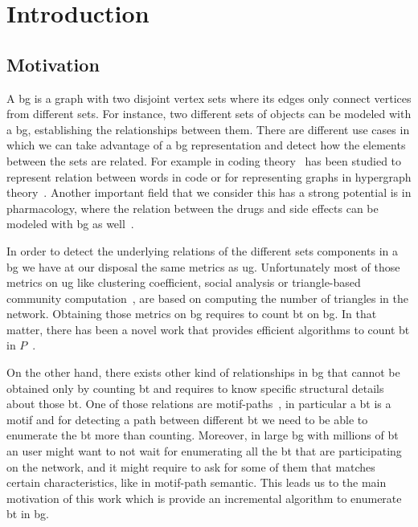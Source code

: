 \chapter{Introduction}\label{intro}
\section{Motivation}
A \acrfull{bg} is a graph with two disjoint vertex sets where its edges only connect vertices from different sets. 
For instance, two different sets of objects can be modeled with a \acrshort{bg}, establishing the relationships between them.
There are different use cases in which we can take advantage of a \acrshort{bg} representation and detect how the elements between the sets
are related. For example in coding theory~\cite{DBLP:journals/corr/WangL13} has been studied to represent relation between words in code 
or for representing graphs in hypergraph theory~\cite{hypergraph}. Another important field that we consider this has a strong potential is 
in pharmacology, where the relation between the drugs and side effects can be modeled with \acrshort{bg} as well~\cite{drugs}.

In order to detect the underlying relations of the different sets components in a \acrshort{bg} we have at our disposal the same metrics as \acrfull{ug}.
Unfortunately most of those metrics on \acrshort{ug} like clustering coefficient, social analysis or triangle-based community computation~\cite{ccoef,detect_graph,Newman_2003},
are based on computing the number of triangles in the network. Obtaining those metrics on \acrshort{bg} requires to count \acrfull{bt} on \acrshort{bg}.
In that matter, there has been a novel work that provides efficient algorithms to count \acrshort{bt} in $P$~\cite{btcount}.

On the other hand, there exists other kind of relationships in \acrshort{bg} that cannot be obtained only by counting \acrshort{bt} and requires to know specific
structural details about those \acrshort{bt}. One of those relations are motif-paths~\cite{Li2019MotifPA}, in particular a \acrshort{bt} is a motif and for detecting
a path between different \acrshort{bt} we need to be able to enumerate the \acrshort{bt} more than counting.
Moreover, in large \acrshort{bg} with millions of \acrshort{bt} an user might want to not wait for enumerating all the \acrshort{bt} that are participating on the network,
and it might require to ask for some of them that matches certain characteristics, like in motif-path semantic. This leads us to the main motivation of this work which is provide
an incremental algorithm to enumerate \acrlong{bt} in \acrlong{bg}.

